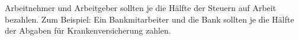 Arbeitnehmer und Arbeitgeber sollten je die Hälfte der Steuern auf Arbeit bezahlen.
Zum Beispiel: Ein Bankmitarbeiter und die Bank sollten je die Hälfte der Abgaben für Krankenversicherung zahlen.